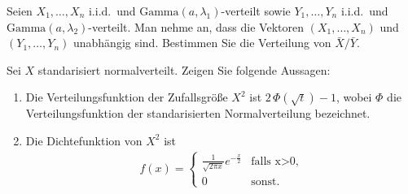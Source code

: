 Seien $X_1,\ldots,X_n$ i.i.d.\ und $\textrm{Gamma}(a, \lambda_1)$-verteilt sowie
$Y_1,\ldots,Y_n$ i.i.d.\ und $\textrm{Gamma}(a,\lambda_2)$-verteilt. Man nehme an,
dass die Vektoren $(X_1,\ldots,X_n)$ und $(Y_1,\ldots,Y_n)$ unabhängig sind. 
Bestimmen Sie die Verteilung von $\bar X/\bar Y$.

 Sei $X$ 
standarisiert normalverteilt. Zeigen Sie folgende Aussagen:
\begin{enumerate}
    \item Die Verteilungsfunktion der Zufallsgröße $X^2$ ist $2\, \Phi(\sqrt{t})-1$,
        wobei $\Phi$ die Verteilungsfunktion der standarisierten Normalverteilung 
        bezeichnet.
    \item Die Dichtefunktion von $X^2$ ist 
        \begin{align*}
            f(x) = \begin{cases}
                \frac{1}{\sqrt{2 \pi x}} e^{-\frac{x}{2}} & \text{falls x>0}, \\
                0 & \text{sonst.}
            \end{cases}
        \end{align*}
\end{enumerate}

